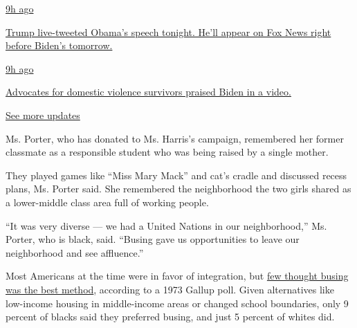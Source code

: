 \href{https://www.nytimes3xbfgragh.onion/live/2020/08/19/us/dnc-convention-election?action=click\&pgtype=Article\&state=default\&region=MAIN_CONTENT_1\&context=storylines_live_updates\#trump-live-tweeted-obamas-speech-tonight-hell-appear-on-fox-news-right-before-bidens-tomorrow}{9h
ago}

\href{https://www.nytimes3xbfgragh.onion/live/2020/08/19/us/dnc-convention-election?action=click\&pgtype=Article\&state=default\&region=MAIN_CONTENT_1\&context=storylines_live_updates\#trump-live-tweeted-obamas-speech-tonight-hell-appear-on-fox-news-right-before-bidens-tomorrow}{Trump
live-tweeted Obama's speech tonight. He'll appear on Fox News right
before Biden's tomorrow.}

\href{https://www.nytimes3xbfgragh.onion/live/2020/08/19/us/dnc-convention-election?action=click\&pgtype=Article\&state=default\&region=MAIN_CONTENT_1\&context=storylines_live_updates\#advocates-for-domestic-violence-survivors-praised-biden-in-a-video}{9h
ago}

\href{https://www.nytimes3xbfgragh.onion/live/2020/08/19/us/dnc-convention-election?action=click\&pgtype=Article\&state=default\&region=MAIN_CONTENT_1\&context=storylines_live_updates\#advocates-for-domestic-violence-survivors-praised-biden-in-a-video}{Advocates
for domestic violence survivors praised Biden in a video.}

\href{https://www.nytimes3xbfgragh.onion/live/2020/08/19/us/dnc-convention-election?action=click\&pgtype=Article\&state=default\&region=MAIN_CONTENT_1\&context=storylines_live_updates}{See
more updates}

Ms. Porter, who has donated to Ms. Harris's campaign, remembered her
former classmate as a responsible student who was being raised by a
single mother.

They played games like ``Miss Mary Mack'' and cat's cradle and discussed
recess plans, Ms. Porter said. She remembered the neighborhood the two
girls shared as a lower-middle class area full of working people.

``It was very diverse --- we had a United Nations in our neighborhood,''
Ms. Porter, who is black, said. ``Busing gave us opportunities to leave
our neighborhood and see affluence.''

Most Americans at the time were in favor of integration, but
\href{https://www.nytimes3xbfgragh.onion/1973/09/09/archives/gallup-finds-few-favor-busing-for-integration.html}{few
thought busing was the best method}, according to a 1973 Gallup poll.
Given alternatives like low-income housing in middle-income areas or
changed school boundaries, only 9 percent of blacks said they preferred
busing, and just 5 percent of whites did.

